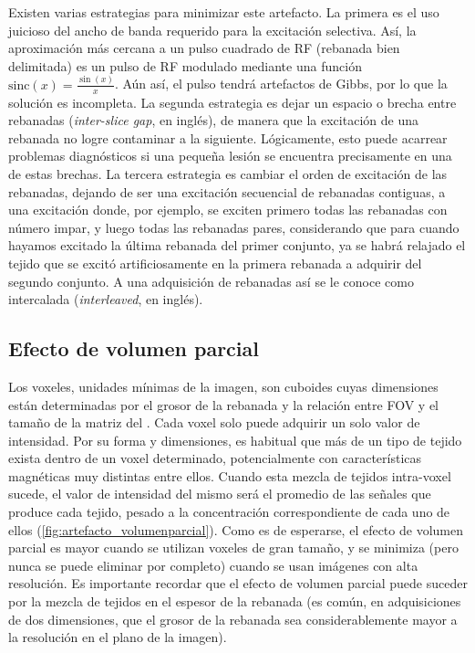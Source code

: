 Existen varias estrategias para minimizar este artefacto. La primera es el uso juicioso del ancho de banda requerido para la excitación selectiva. Así, la aproximación más cercana a un pulso cuadrado de RF (rebanada bien delimitada) es un pulso de RF modulado mediante una función $\mathrm{sinc}(x)=\frac{\sin(x)}{x}$. Aún así, el pulso tendrá artefactos de Gibbs, por lo que la solución es incompleta. La segunda estrategia es dejar un espacio o brecha entre rebanadas (\textit{inter-slice gap}, en inglés), de manera que la excitación de una rebanada no logre contaminar a la siguiente. Lógicamente, esto puede acarrear problemas diagnósticos si una pequeña lesión se encuentra precisamente en una de estas brechas. La tercera estrategia es cambiar el orden de excitación de las rebanadas, dejando de ser una excitación secuencial de rebanadas contiguas, a una excitación donde, por ejemplo, se exciten primero todas las rebanadas con número impar, y luego todas las rebanadas pares, considerando que para cuando hayamos excitado la última rebanada del primer conjunto, ya se habrá relajado el tejido que se excitó artificiosamente en la primera rebanada a adquirir del segundo conjunto. A una adquisición de rebanadas así se le conoce como intercalada (\textit{interleaved}, en inglés).


\subsection{Efecto de volumen parcial}
Los voxeles, unidades mínimas de la imagen, son cuboides cuyas dimensiones están determinadas por el grosor de la rebanada y la relación entre FOV y el tamaño de la matriz del \espaciok. Cada voxel solo puede adquirir un solo valor de intensidad.  Por su forma y dimensiones, es habitual que más de un tipo de tejido exista dentro de un voxel determinado, potencialmente con características magnéticas muy distintas entre ellos. Cuando esta mezcla de tejidos intra-voxel sucede, el valor de intensidad del mismo será el promedio de las señales que produce cada tejido, pesado a la concentración correspondiente de cada uno de ellos (\ref{fig:artefacto_volumenparcial}). Como es de esperarse, el efecto de volumen parcial es mayor cuando se utilizan voxeles de gran tamaño, y se minimiza (pero nunca se puede eliminar por completo) cuando se usan imágenes con alta resolución. Es importante recordar que el efecto de volumen parcial puede suceder por la mezcla de tejidos en el espesor de la rebanada (es común, en adquisiciones de dos dimensiones, que el grosor de la rebanada sea considerablemente mayor a la resolución en el plano de la imagen).

